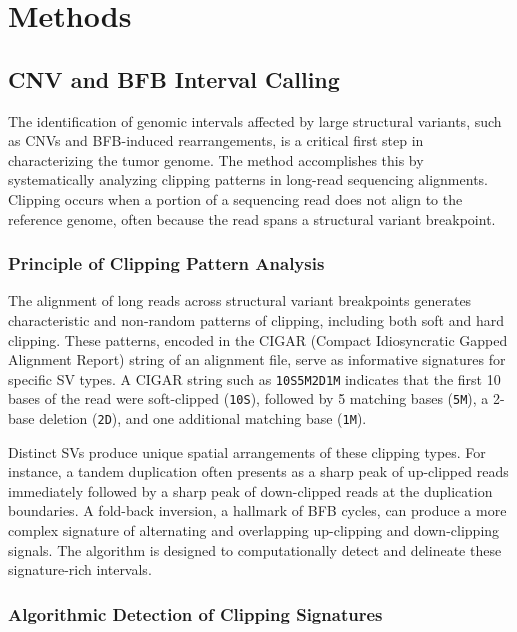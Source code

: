 \documentclass[pdflatex,sn-nature]{sn-jnl}
\begin{document}
\section{Methods}\label{methods}

\subsection{CNV and BFB Interval Calling}\label{cnv-and-bfb-interval-calling}

The identification of genomic intervals affected by large structural variants, such as CNVs and BFB-induced rearrangements, is a critical first step in characterizing the tumor genome. The method accomplishes this by systematically analyzing clipping patterns in long-read sequencing alignments. Clipping occurs when a portion of a sequencing read does not align to the reference genome, often because the read spans a structural variant breakpoint.

\subsubsection{Principle of Clipping Pattern Analysis}\label{principle-of-clipping-pattern-analysis}

The alignment of long reads across structural variant breakpoints generates characteristic and non-random patterns of clipping, including both soft and hard clipping. These patterns, encoded in the CIGAR (Compact Idiosyncratic Gapped Alignment Report) string of an alignment file, serve as informative signatures for specific SV types. A CIGAR string such as \texttt{10S5M2D1M} indicates that the first 10 bases of the read were soft-clipped (\texttt{10S}), followed by 5 matching bases (\texttt{5M}), a 2-base deletion (\texttt{2D}), and one additional matching base (\texttt{1M}).

Distinct SVs produce unique spatial arrangements of these clipping types. For instance, a tandem duplication often presents as a sharp peak of up-clipped reads immediately followed by a sharp peak of down-clipped reads at the duplication boundaries. A fold-back inversion, a hallmark of BFB cycles, can produce a more complex signature of alternating and overlapping up-clipping and down-clipping signals. The algorithm is designed to computationally detect and delineate these signature-rich intervals.

\subsubsection{Algorithmic Detection of Clipping Signatures}\label{algorithmic-detection-of-clipping-signatures}
\end{document}
